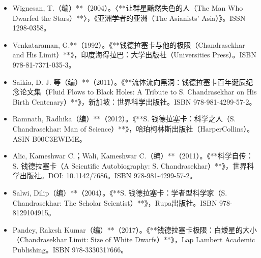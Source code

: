 \begin{itemize}
\item Wignesan, T.（编）**（2004）。〈**让群星黯然失色的人（The Man Who Dwarfed the Stars）**〉，《亚洲学者的亚洲（The Asianists’ Asia）》。ISSN 1298-0358。

\item Venkataraman, G.**（1992）。《**钱德拉塞卡与他的极限（Chandrasekhar and His Limit）**》，印度海得拉巴：大学出版社（Universities Press）。ISBN 978-81-7371-035-3。

\item Saikia, D. J. 等（编）**（2011）。《**流体流向黑洞：钱德拉塞卡百年诞辰纪念论文集（Fluid Flows to Black Holes: A Tribute to S. Chandrasekhar on His Birth Centenary）**》，新加坡：世界科学出版社。ISBN 978-981-4299-57-2。

\item Ramnath, Radhika（编）**（2012）。《**S. 钱德拉塞卡：科学之人（S. Chandrasekhar: Man of Science）**》，哈珀柯林斯出版社（HarperCollins）。ASIN B00C3EWIME。

\item Alic, Kameshwar C.；Wali, Kameshwar C.（编）**（2011）。《**科学自传：S. 钱德拉塞卡（A Scientific Autobiography: S. Chandrasekhar）**》，世界科学出版社。DOI: 10.1142/7686。ISBN 978-981-4299-57-2。

\item Salwi, Dilip（编）**（2004）。《**S. 钱德拉塞卡：学者型科学家（S. Chandrasekhar: The Scholar Scientist）**》，Rupa出版社。ISBN 978-8129104915。

\item Pandey, Rakesh Kumar（编）**（2017）。《**钱德拉塞卡极限：白矮星的大小（Chandrasekhar Limit: Size of White Dwarfs）**》，Lap Lambert Academic Publishing。ISBN 978-3330317666。

\end{itemize}